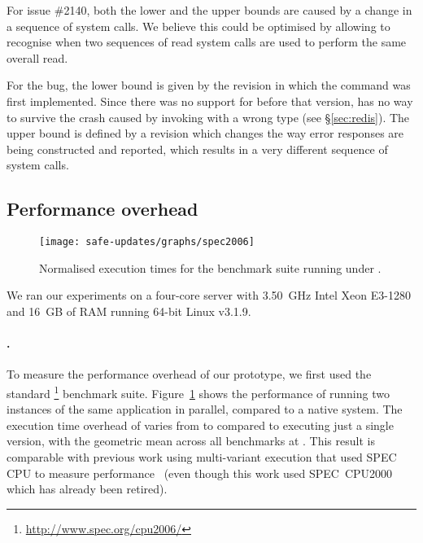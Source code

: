 For \lighttpd issue \#2140, both the lower and the upper bounds are
caused by a change in a sequence of  system calls.  We
believe this could be optimised by allowing \mx to recognise when two
sequences of read system calls are used to perform the same overall
read.


For the \redis bug, the lower bound is given by the revision in which the
 command was first implemented.  Since there was no support for
 before that version, \mx has no way to survive the crash caused
by invoking  with a wrong type (see \S\ref{sec:redis}).  The
upper bound is defined by a revision which changes the way error responses are
being constructed and reported, which results in a very different sequence of
system calls.



\subsection{Performance overhead}
\label{sec:performance}

\begin{figure}[!t]
\centering
\texttt{[image: safe-updates/graphs/spec2006]}
\caption{Normalised execution times for the \spec benchmark suite running under
\mx.}
\label{fig:spec}
\end{figure}

We ran our experiments on a four-core server with 3.50~GHz Intel
Xeon E3-1280 and 16~GB of RAM running 64-bit Linux v3.1.9.

\paragraph{\spec.}
To measure the performance overhead of our prototype, we first used
the standard \spec\footnote{\url{http://www.spec.org/cpu2006/}}
benchmark suite.  Figure~\ref{fig:spec} shows the performance of \mx
running two instances of the same application in parallel, compared to
a native system. The execution time overhead of \mx varies
from \minOverSPEC to \maxOverSPEC compared to executing just a single
version, with the geometric mean across all \numSPECbench benchmarks at
\avgOverSPEC. This result is comparable with previous work using multi-variant
execution that used SPEC CPU to measure performance~\cite{orchestra09} (even
though this work used SPEC~CPU2000 which has already been retired).

